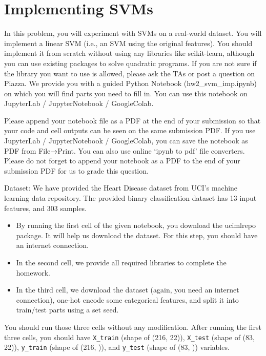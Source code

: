 \documentclass[a3paper,12pt]{extarticle} %
\begin{document}
\section {Implementing SVMs}

In this problem, you will experiment with SVMs on a real-world dataset. You will implement a linear SVM (i.e., an SVM using the original features). You should implement it from scratch without using any libraries like scikit-learn, although you can use existing packages to solve quadratic programs. If you are not sure if the library you want to use is allowed, please ask the TAs or post a question on Piazza. We provide you with a guided Python Notebook (hw2\_svm\_imp.ipynb) on which you will find parts you need to fill in. You can use this notebook on JupyterLab / JupyterNotebook / GoogleColab.

Please append your notebook file as a PDF at the end of your submission so that your code and cell outputs can be seen on the same submission PDF. If you use JupyterLab / JupyterNotebook / GoogleColab, you can save the notebook as PDF from File→Print. You can also use online ‘ipynb to pdf’ file converters. Please do not forget to append your notebook as a PDF to the end of your submission PDF for us to grade this question.

Dataset: We have provided the Heart Disease dataset from UCI’s machine learning data repository. The provided binary classification dataset has 13 input features, and 303 samples.

\begin{itemize}
    \item By running the first cell of the given notebook, you download the ucimlrepo package. It will help us download the dataset. For this step, you should have an internet connection.
    \item In the second cell, we provide all required libraries to complete the homework.
    \item In the third cell, we download the dataset (again, you need an internet connection), one-hot encode some categorical features, and split it into train/test parts using a set seed.
\end{itemize}

You should run those three cells without any modification. After running the first three cells, you should have \texttt{X\_train} (shape of (216, 22)), \texttt{X\_test} (shape of (83, 22)), \texttt{y\_train} (shape of (216, )), and \texttt{y\_test} (shape of (83, )) variables.
\end{document}
